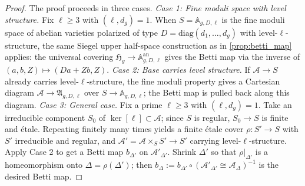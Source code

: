 \begin{proof}
  The proof proceeds in three cases.
  \textit{Case 1: Fine moduli space with level structure.}
  Fix \(\ell \ge 3\) with \((\ell, d_g) = 1\). When
  \(S = \mathbb{A}_{g,D,\ell}\) is the fine moduli space of abelian varieties
  polarized of type \(D = \mathrm{diag}(d_1,\ldots,d_g)\) with level-\(\ell\)-structure,
  the same Siegel upper half-space construction as in \cref{prop:betti_map} applies:
  the universal covering \(\mathfrak{H}_g \to \mathbb{A}_{g,D,\ell}^{\mathrm{an}}\)
  gives the Betti map via the inverse of \((a,b,Z) \mapsto (Da + Zb, Z)\).
  \textit{Case 2: Base carries level structure.}
  If \(\mathcal{A} \to S\) already carries level-\(\ell\)-structure, the fine
  moduli property gives a Cartesian diagram \(\mathcal{A} \to \mathfrak{A}_{g,D,\ell}\)
  over \(S \to \mathbb{A}_{g,D,\ell}\); the Betti map is pulled back along this diagram.
  \textit{Case 3: General case.}
  Fix a prime \(\ell \ge 3\) with \((\ell, d_g) = 1\). Take an irreducible component
  \(S_0\) of \(\ker[\ell] \subset \mathcal{A}\); since \(S\) is regular,
  \(S_0 \to S\) is finite and étale. Repeating finitely many times yields a
  finite étale cover \(\rho \colon S' \to S\) with \(S'\) irreducible and regular,
  and \(\mathcal{A}' = \mathcal{A} \times_S S' \to S'\) carrying level-\(\ell\)-structure.
  Apply Case 2 to get a Betti map \(b_{\Delta'}\) on \(\mathcal{A}'_{\Delta'}\).
  Shrink \(\Delta'\) so that \(\rho|_{\Delta'}\) is a homeomorphism onto
  \(\Delta = \rho(\Delta')\); then \(b_\Delta := b_{\Delta'} \circ (\mathcal{A}'_{\Delta'} \cong \mathcal{A}_\Delta)^{-1}\)
  is the desired Betti map.
\end{proof}

